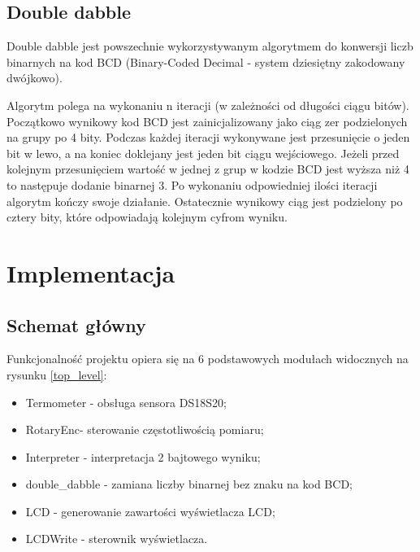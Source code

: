 \documentclass[a4paper]{article}
\begin{document}
\subsection{Double dabble}
Double dabble jest powszechnie wykorzystywanym algorytmem do konwersji liczb binarnych na kod BCD (Binary-Coded Decimal - system dziesiętny zakodowany dwójkowo). 

Algorytm polega na wykonaniu n iteracji (w zależności od długości ciągu bitów). Początkowo wynikowy kod BCD jest zainicjalizowany jako ciąg zer podzielonych na grupy po 4 bity. Podczas każdej iteracji wykonywane jest przesunięcie o jeden bit w lewo, a na koniec doklejany jest jeden bit ciągu wejściowego. Jeżeli przed kolejnym przesunięciem wartość w jednej z grup w kodzie BCD jest wyższa niż 4 to następuje dodanie binarnej 3. Po wykonaniu odpowiedniej ilości iteracji algorytm kończy swoje działanie. Ostatecznie wynikowy ciąg jest podzielony po cztery bity, które odpowiadają kolejnym cyfrom wyniku. 

\section{Implementacja}

\subsection{Schemat główny}

Funkcjonalność projektu opiera się na 6 podstawowych modułach widocznych na rysunku \ref{top_level}:
\begin{itemize}
\item Termometer - obsługa sensora DS18S20;
\item RotaryEnc- sterowanie częstotliwością pomiaru;
\item Interpreter - interpretacja 2 bajtowego wyniku;
\item double\_dabble - zamiana liczby binarnej bez znaku na kod BCD;
\item LCD - generowanie zawartości wyświetlacza LCD;
\item LCDWrite - sterownik wyświetlacza.
\end{itemize}
\end{document}
